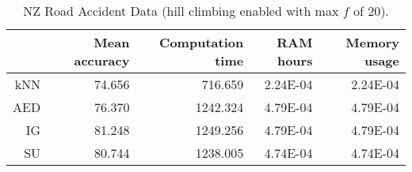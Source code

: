 \begin{table}[h]
\centering
\begin{tabular}{r|rrrr}	
    & Mean accuracy & Computation time & RAM hours & Memory usage \\ \hline
kNN & 74.656                   & 716.659         & 2.24E-04  & 2.24E-04     \\
AED & 76.370                   & 1242.324         & 4.79E-04  & 4.79E-04     \\
IG  & 81.248                   & 1249.256         & 4.79E-04  & 4.79E-04     \\
SU  & 80.744                   & 1238.005         & 4.74E-04  & 4.74E-04    
\end{tabular}
\caption{NZ Road Accident Data (hill climbing enabled with max $f$ of 20).}
\label{Table:NZRoad_H}
\end{table}